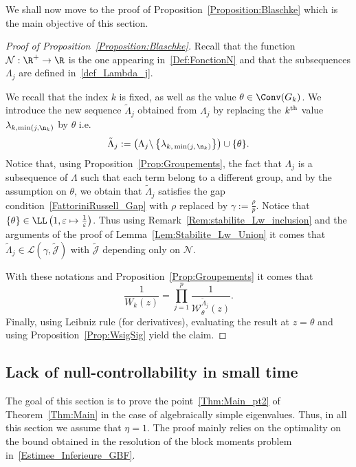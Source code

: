 We shall now move to the proof of Proposition~\ref{Proposition:Blaschke} which is the main objective of this section.
\begin{proof}[Proof of Proposition~\ref{Proposition:Blaschke}]
Recall that the function $\mathcal{N} : \R^+ \to \R$ is the one appearing in~\eqref{Def:FonctionN} and that the subsequences $\Lambda_j$ are defined in~\eqref{def_Lambda_j}.

We recall that the index $k$ is fixed, as well as the value $\theta\in \Conv(G_k)$. We introduce the new sequence $\tilde{\Lambda}_j$ obtained from $\Lambda_j$ by replacing the $k^{\rm th}$ value $\lambda_{k,\min(j,\n_k)}$ by $\theta$ i.e.
\[
\tilde{\Lambda}_j := \left(\Lambda_j \backslash \left\{ \lambda_{k,\,\min(j,\,\n_k)} \right\} \right) \cup \{ \theta \}.
\]
Notice that, using Proposition~\ref{Prop:Groupements}, the fact that $\Lambda_j$ is a subsequence of $\Lambda$ such that each term belong to a different group, and by the assumption on $\theta$, we obtain that $\tilde{\Lambda}_j$ satisfies the gap condition~\eqref{FattoriniRussell_Gap} with $\rho$ replaced by $\gamma:=\frac{\rho}{p}$. Notice that $\{ \theta \} \in \LL \left(1, \varepsilon \mapsto \frac{1}{\varepsilon} \right)$. Thus using Remark~\ref{Rem:stabilite_Lw_inclusion} and the arguments of the proof of Lemma~\ref{Lem:Stabilite_Lw_Union} it comes that $\tilde{\Lambda}_j \in \mathcal{L}\left(\gamma,\tilde{\mathcal{J}}\right)$ with $\tilde{\mathcal{J}}$ depending only on $\mathcal{N}$.


With these notations and Proposition~\ref{Prop:Groupements} it comes that
\[
\frac{1}{W_k(z)} = \prod_{j=1}^p \frac{1}{\mathcal{W}^{\tilde{\Lambda}_j}_{\theta} (z)}.
\]
Finally, using Leibniz rule (for derivatives), evaluating the result at $z=\theta$ and using Proposition~\ref{Prop:WsigSig} yield the claim.
\end{proof}



\subsection{Lack of null-controllability in small time}\label{Sec:NonControlabilite}

The goal of this section is to prove the point~\eqref{Thm:Main_pt2} of Theorem~\ref{Thm:Main} in the case of algebraically simple eigenvalues. Thus, in all this section we assume that $\eta=1$. The proof mainly relies on the optimality on the bound obtained in the resolution of the block moments problem in~\eqref{Estimee_Inferieure_GBF}.



